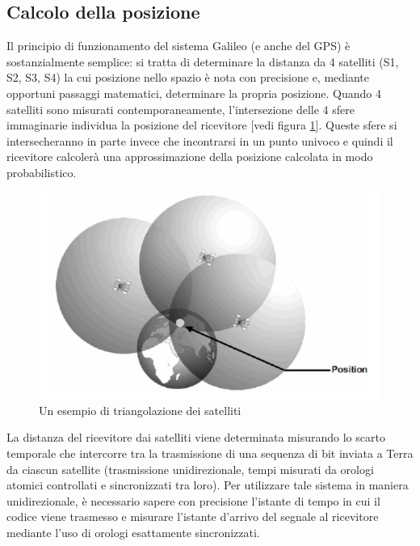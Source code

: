 \subsection{Calcolo della posizione}
Il principio di funzionamento del sistema Galileo (e anche del GPS) è sostanzialmente semplice: si tratta di determinare la distanza da 4 satelliti (S1, S2, S3, S4) la cui posizione nello spazio è nota con precisione e, mediante opportuni passaggi matematici, determinare la propria posizione. Quando 4 satelliti sono misurati contemporaneamente, l’intersezione delle 4 sfere immaginarie individua la posizione del ricevitore [vedi figura \ref{fig: gps_triangolazione }]. Queste sfere si intersecheranno in parte invece che incontrarsi in un punto univoco e quindi il ricevitore calcolerà una approssimazione della posizione calcolata in modo probabilistico.
\begin{figure}[h]
\centering
\includegraphics[scale=0.6]{images/gps_triangolazione.png}
\caption{Un esempio di triangolazione dei satelliti}
\label{fig: gps_triangolazione }
\end{figure}
La distanza del ricevitore dai satelliti viene determinata misurando lo scarto temporale che intercorre tra la trasmissione di una sequenza di bit inviata a Terra da ciascun satellite (trasmissione unidirezionale, tempi misurati da orologi atomici controllati e sincronizzati tra loro). Per utilizzare tale sistema in maniera unidirezionale, è necessario sapere con precisione l'istante di tempo in cui il codice viene trasmesso e misurare l'istante d'arrivo del segnale al ricevitore mediante l'uso di orologi esattamente sincronizzati. 

